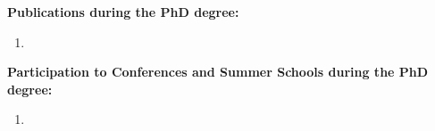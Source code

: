 \textbf{Publications during the PhD degree:}
\begin{enumerate}
    \item %
\end{enumerate}

\vspace{1em}

\textbf{Participation to Conferences and Summer Schools during the PhD degree:}
\begin{enumerate}
    \item %
\end{enumerate}
